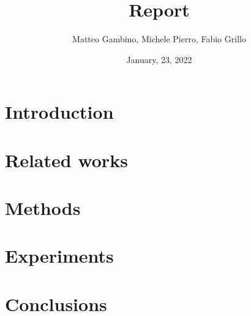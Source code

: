 \documentclass{article}
\title{Report}
\author{Matteo Gambino, Michele Pierro, Fabio Grillo}
\date{January, 23, 2022}
\begin{document}
\maketitle
\begin{multicols}{2}
\section{Introduction}
\section{Related works}
\section{Methods}
\section{Experiments}
\section{Conclusions}
\end{multicols}
\end{document}

